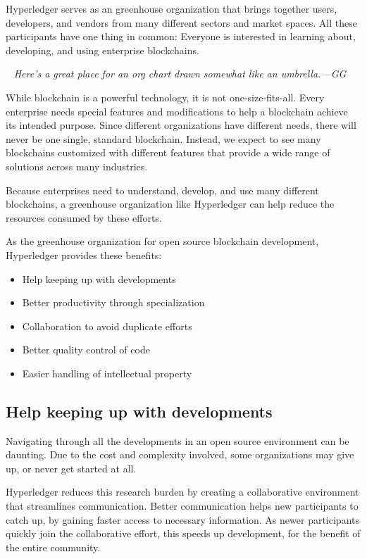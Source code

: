Hyperledger serves as an greenhouse organization that brings together users, developers, and vendors from many different sectors and market spaces. 
All these participants have one thing in common: Everyone is interested in learning about, developing, and using enterprise blockchains. 

~\newline
\emph{Here's a great place for an org chart drawn somewhat like an umbrella.---GG}
~\newline

While blockchain is a powerful technology, it is not one-size-fits-all. 
Every enterprise needs special features and modifications to help a blockchain achieve its intended purpose.
Since different organizations have different needs, there will never be one single, standard blockchain. 
Instead, we expect to see many blockchains customized with different features that provide a wide range of solutions across many industries.

Because enterprises need to understand, develop, and use many different blockchains, a greenhouse organization like Hyperledger can help reduce the resources consumed by these efforts.

As the greenhouse organization for open source blockchain development, Hyperledger provides these benefits: 
\begin{itemize}
\item Help keeping up with developments
\item Better productivity through specialization
\item Collaboration to avoid duplicate efforts
\item Better quality control of code
\item Easier handling of intellectual property
\end{itemize}

\subsection{Help keeping up with developments}
Navigating through all the developments in an open source environment can be daunting. 
Due to the cost and complexity involved, some organizations may give up, or never get started at all. 

Hyperledger reduces this research burden by creating a collaborative environment that streamlines communication. 
Better communication helps new participants to catch up, by gaining faster access to necessary information.
As newer participants quickly join the collaborative effort, this speeds up development, for the benefit of the entire community. 

